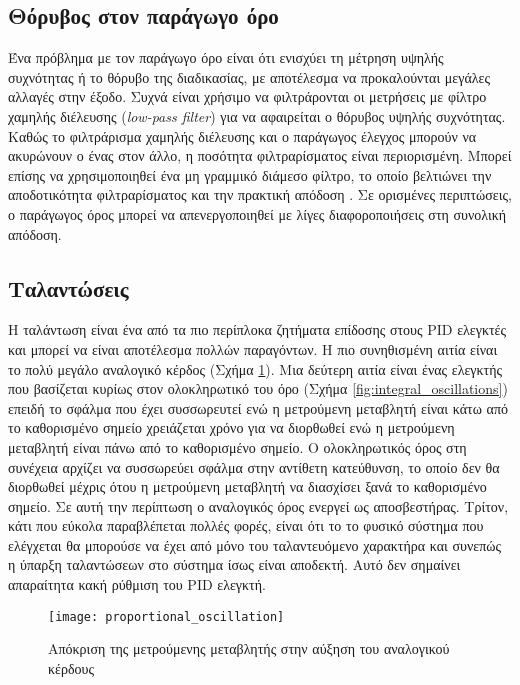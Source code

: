 \subsection{Θόρυβος στον παράγωγο όρο}

Ένα πρόβλημα με τον παράγωγο όρο είναι ότι ενισχύει τη μέτρηση υψηλής συχνότητας ή το θόρυβο της διαδικασίας, με αποτέλεσμα να προκαλούνται μεγάλες αλλαγές στην έξοδο. Συχνά είναι χρήσιμο να φιλτράρονται οι μετρήσεις με φίλτρο χαμηλής διέλευσης (\emph{low-pass filter}) για να αφαιρείται ο θόρυβος υψηλής συχνότητας. Καθώς το φιλτράρισμα χαμηλής διέλευσης και ο παράγωγος έλεγχος μπορούν να ακυρώνουν ο ένας στον άλλο, η ποσότητα φιλτραρίσματος είναι περιορισμένη. Μπορεί επίσης να χρησιμοποιηθεί ένα μη γραμμικό διάμεσο φίλτρο, το οποίο βελτιώνει την αποδοτικότητα φιλτραρίσματος και την πρακτική απόδοση \cite{chong}. Σε ορισμένες περιπτώσεις, ο παράγωγος όρος μπορεί να απενεργοποιηθεί με λίγες διαφοροποιήσεις στη συνολική απόδοση.

\subsection{Ταλαντώσεις}

Η ταλάντωση είναι ένα από τα πιο περίπλοκα ζητήματα επίδοσης στους PID ελεγκτές και μπορεί να είναι αποτέλεσμα πολλών παραγόντων. Η πιο συνηθισμένη αιτία είναι το πολύ μεγάλο αναλογικό κέρδος (Σχήμα \ref{fig:proportional_oscillation}). Μια δεύτερη αιτία είναι ένας ελεγκτής που βασίζεται κυρίως στον ολοκληρωτικό του όρο (Σχήμα \ref{fig:integral_oscillations}) επειδή το σφάλμα που έχει συσσωρευτεί ενώ η μετρούμενη μεταβλητή είναι κάτω από το καθορισμένο σημείο χρειάζεται χρόνο για να διορθωθεί ενώ η μετρούμενη μεταβλητή είναι πάνω από το καθορισμένο σημείο. Ο ολοκληρωτικός όρος στη συνέχεια αρχίζει να συσσωρεύει σφάλμα στην αντίθετη κατεύθυνση, το οποίο δεν θα διορθωθεί μέχρις ότου η μετρούμενη μεταβλητή να διασχίσει ξανά το καθορισμένο σημείο. Σε αυτή την περίπτωση ο αναλογικός όρος ενεργεί ως αποσβεστήρας. Τρίτον, κάτι που εύκολα παραβλέπεται πολλές φορές, είναι ότι το το φυσικό σύστημα που ελέγχεται θα μπορούσε να έχει από μόνο του ταλαντευόμενο χαρακτήρα και συνεπώς η ύπαρξη ταλαντώσεων στο σύστημα ίσως είναι αποδεκτή. Αυτό δεν σημαίνει απαραίτητα κακή ρύθμιση του PID ελεγκτή.

\begin{figure}[h]
  \centering
  \texttt{[image: proportional\_oscillation]}
  \caption{Απόκριση της μετρούμενης μεταβλητής στην αύξηση του αναλογικού κέρδους}
  \label{fig:proportional_oscillation}
\end{figure}

